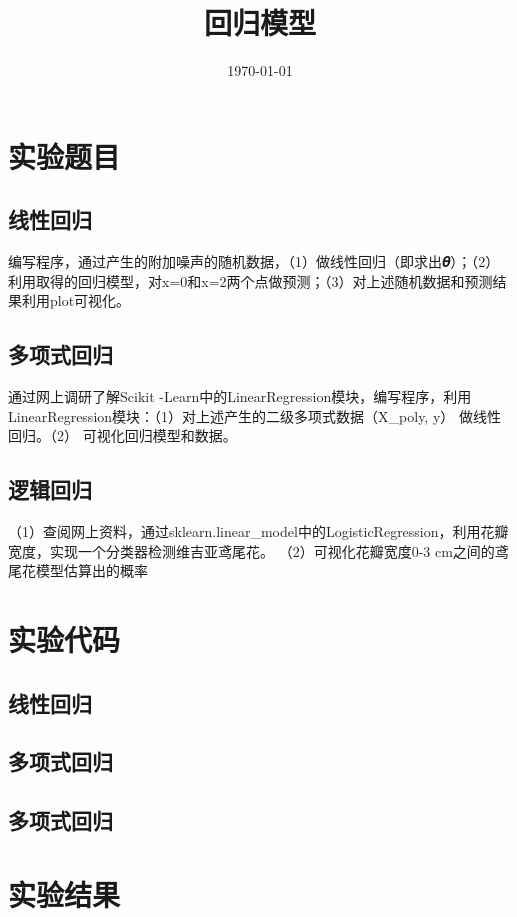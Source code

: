 \documentclass{../source/Experiment}
\title{回归模型}
\date{\today}
\begin{document}
\makecover
\section{实验题目}
\subsection{线性回归}
编写程序，通过产生的附加噪声的随机数据，（1）做线性回归（即求出𝜽）；（2）利用取得的回归模型，对x=0和x=2两个点做预测；（3）对上述随机数据和预测结果利用plot可视化。

\subsection{多项式回归}

通过网上调研了解Scikit -Learn中的LinearRegression模块，编写程序，利用LinearRegression模块：（1）对上述产生的二级多项式数据（X\_poly, y） 做线性回归。（2） 可视化回归模型和数据。


\subsection{逻辑回归}

（1）查阅网上资料，通过sklearn.linear\_model中的LogisticRegression，利用花瓣宽度，实现一个分类器检测维吉亚鸢尾花。
（2）可视化花瓣宽度0-3 cm之间的鸢尾花模型估算出的概率

\section{实验代码}
\subsection{线性回归}


\subsection{多项式回归}

\subsection{多项式回归}

\section{实验结果}
\end{document}
